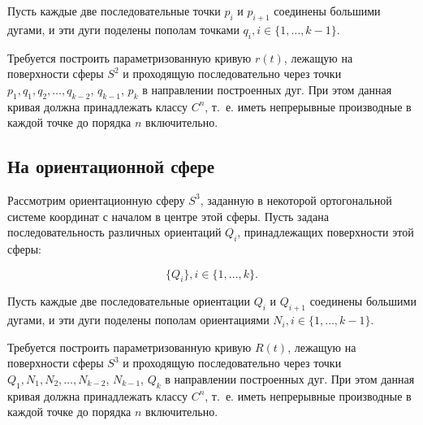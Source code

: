Пусть каждые две последовательные точки $p_i$ и $p_{i+1}$ соединены большими дугами, и эти дуги поделены пополам
точками $q_i, i \in \{1, \dots, k-1\}$.

Требуется построить параметризованную кривую $r(t)$, лежащую на поверхности сферы $S^2$ и проходящую последовательно
через точки $p_1, q_1, q_2, \dots, q_{k-2}$, $q_{k-1}$, $p_k$ в направлении построенных дуг. При этом данная кривая должна
принадлежать классу $C^n$, т.~е. иметь непрерывные производные в каждой точке до порядка $n$ включительно.

\subsection*{На ориентационной сфере}

Рассмотрим ориентационную сферу $S^3$, заданную в некоторой ортогональной сис\-теме координат с началом в центре этой
сферы. Пусть задана последовательность различных ориентаций $Q_i$, принадлежащих поверхности этой сферы:

$$\{Q_i\}, i \in \{1, \dots, k\}.$$

Пусть каждые две последовательные ориентации $Q_i$ и $Q_{i+1}$ соединены большими дугами, и эти дуги поделены пополам
ориентациями $N_i, i \in \{1, \dots, k-1\}$.

Требуется построить параметризованную кривую $R(t)$, лежащую на поверхности сферы $S^3$ и проходящую последовательно
через точки $Q_1, N_1, N_2, \dots, N_{k-2}$, $N_{k-1}$, $Q_k$ в направлении построенных дуг. При этом данная кривая должна
принадлежать классу $C^n$, т.~е. иметь непрерывные производные в каждой точке до порядка $n$ включительно.

